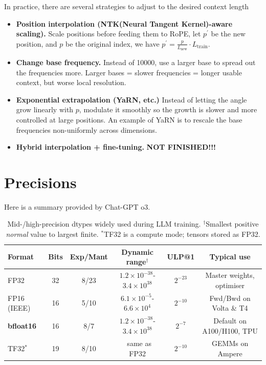 \documentclass[11pt]{article}  %
\begin{document}
In practice, there are several strategies to adjust to the desired context length
\begin{itemize}
  \item \textbf{Position interpolation (NTK(Neural Tangent Kernel)-aware scaling).} Scale positions before feeding them to RoPE, let $p^\prime$ be the new position, and $p$ be the original index, we have $p^\prime = \frac{p}{L_{\text{new}}} \cdot L_{\text{train}}$.
  
  \item \textbf{Change base frequency.} Instead of 10000, use a larger base to spread out the frequencies more. Larger bases = slower frequencies = longer usable context, but worse local resolution.
  
  \item \textbf{Exponential extrapolation (YaRN, etc.)} Instead of letting the angle grow linearly with $p$, modulate it smoothly so the growth is slower and more controlled at large positions. An example of YaRN is to rescale the base frequencies non-uniformly across dimensions.
  
  \item \textbf{Hybrid interpolation + fine-tuning.} \textbf{NOT FINISHED!!!}
\end{itemize}



\section{Precisions}
Here is a summary provided by Chat-GPT o3.
\begin{table}[ht]
\centering
\renewcommand{\arraystretch}{1.15}
\begin{tabular}{@{}lccccc@{}}
\toprule
\textbf{Format} & \textbf{Bits} & \textbf{Exp/Mant} &
\textbf{Dynamic range$^\dagger$} & \textbf{ULP@1} &
\textbf{Typical use} \\
\midrule
FP32        & 32 & 8/23 & $1.2\!\times\!10^{-38}$-$3.4\!\times\!10^{38}$ & $2^{-23}$ & Master weights, optimiser \\
FP16 (IEEE) & 16 & 5/10 & $6.1\!\times\!10^{-5}$-$6.6\!\times\!10^{4}$   & $2^{-10}$ & Fwd/Bwd on Volta \& T4 \\
\textbf{bfloat16} & 16 & 8/7  & $1.2\!\times\!10^{-38}$-$3.4\!\times\!10^{38}$ & $2^{-7}$  & Default on A100/H100, TPU \\
TF32$^{*}$  & 19 & 8/10 & $\phantom{0}$same as FP32 & $2^{-10}$ & GEMMs on Ampere \\
\bottomrule
\end{tabular}
\caption{Mid-/high-precision dtypes widely used during LLM training.%
$^\dagger$Smallest positive \emph{normal} value to largest finite.%
$^{*}$TF32 is a compute mode; tensors stored as FP32.}
\end{table}
\end{document}
